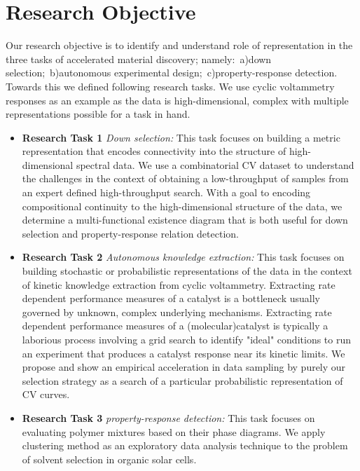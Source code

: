 \section*{Research Objective}
Our research objective is to identify and understand role of representation in the three tasks of accelerated material discovery; namely:~a)down selection;~b)autonomous experimental design;~c)property-response detection. Towards this we defined following research tasks. We use cyclic voltammetry responses as an example as the data is high-dimensional, complex with multiple representations possible for a task in hand.
\begin{itemize}
    \item {\textbf{Research Task 1 }\textit{Down selection:} This task focuses on building a metric representation that encodes connectivity into the structure of high-dimensional spectral data. We use a combinatorial CV dataset to understand the challenges in the context of obtaining a low-throughput of samples from an expert defined high-throughput search. With a goal to encoding compositional continuity to the high-dimensional structure of the data, we determine a multi-functional existence diagram that is both useful for down selection and property-response relation detection.}
    \item{\textbf{Research Task 2 }\textit{Autonomous knowledge extraction:} This task focuses on building stochastic or probabilistic representations of the data in the context of kinetic knowledge extraction from cyclic voltammetry. Extracting rate dependent performance measures of a catalyst is a bottleneck usually governed by unknown, complex underlying mechanisms. Extracting rate dependent performance measures of a (molecular)catalyst is typically a laborious process involving a grid search to identify "ideal" conditions to run an experiment that produces a catalyst response near its kinetic limits. We propose and show an empirical acceleration in data sampling by purely our selection strategy as a search of a particular probabilistic representation of CV curves.}
    \item{\textbf{Research Task 3 }\textit{property-response detection: } This task focuses on evaluating polymer mixtures based on their phase diagrams. We apply clustering method as an exploratory data analysis technique to the problem of solvent selection in organic solar cells.}
\end{itemize}
